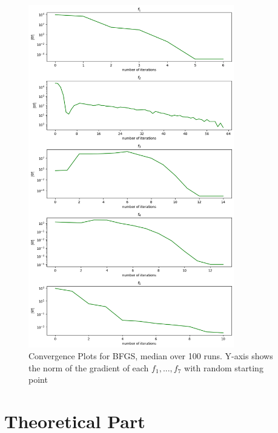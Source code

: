 \documentclass[a4paper]{article}
\begin{document}
\begin{figure}[]
  \centering
  \includegraphics[width=0.8\textwidth]{plt_grad_norms.png}
  \caption{Convergence Plots for BFGS, median over 100 runs. Y-axis shows the
    norm of the gradient of each $f_1,...,f_7$ with random starting point}
  \label{plt2}
\end{figure}
\section{Theoretical Part}
\end{document}
